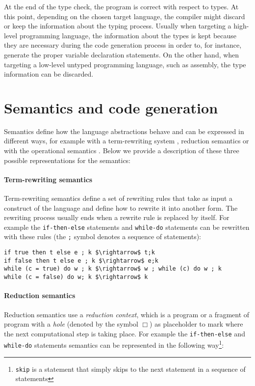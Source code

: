 At the end of the type check, the program is correct with respect to types. At this point, depending on the chosen target language, the compiler might discard or keep the information about the typing process. Usually when targeting a high-level programming language, the information about the types is kept because they are necessary during the code generation process in order to, for instance, generate the proper variable declaration statements. On the other hand, when targeting a low-level untyped programming language, such as assembly, the type information can be discarded.


\section{Semantics and code generation}
\label{sec:ch_background_semantics}
Semantics define how the language abstractions behave and can be expressed in different ways, for example with a term-rewriting system \cite{klop1992term}, reduction semantics \cite{FELLEISEN1992235} or with the operational semantics \cite{plotkin1981}. Below we provide a description of these three possible representations for the semantics:

\paragraph{Term-rewriting semantics}
Term-rewriting semantics define a set of rewriting rules that take as input a construct of the language and define how to rewrite it into another form. The rewriting process usually ends when a rewrite rule is replaced by itself. For example the \texttt{if-then-else} statements and \texttt{while-do} statements can be rewritten with these rules (the \texttt{;} symbol denotes a sequence of statements):

\begin{lstlisting}[mathescape = true]
if true then t else e ; k $\rightarrow$ t;k
if false then t else e ; k $\rightarrow$ e;k
while (c = true) do w ; k $\rightarrow$ w ; while (c) do w ; k
while (c = false) do w; k $\rightarrow$ k 
\end{lstlisting}

\paragraph{Reduction semantics}
Reduction semantics use a \textit{reduction context}, which is a program or a fragment of program with a \textit{hole} (denoted by the symbol $\Box$) as placeholder to mark where the next computational step is taking place. For example the \texttt{if-then-else} and \texttt{while-do} statements semantics can be represented in the following way\footnote{\texttt{skip} is a statement that simply skips to the next statement in a sequence of statements}:

